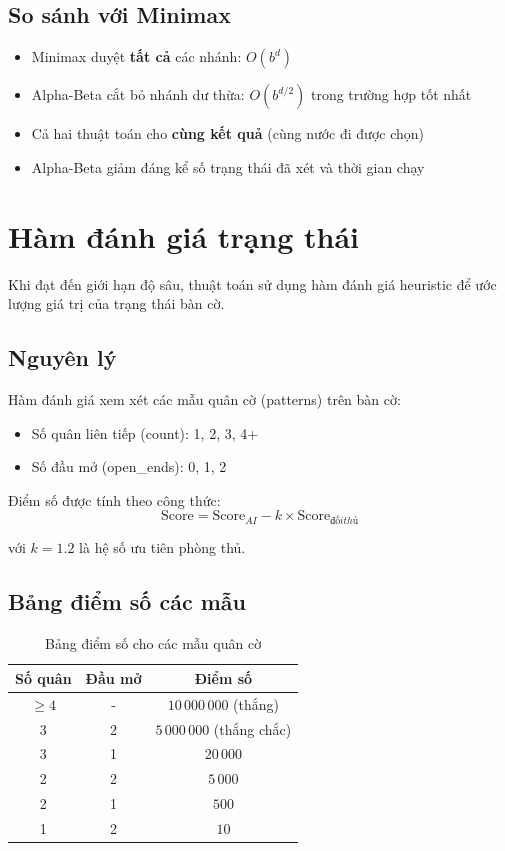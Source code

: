 \documentclass[12pt,a4paper]{article}
\begin{document}
\subsection{So sánh với Minimax}

\begin{itemize}
    \item Minimax duyệt \textbf{tất cả} các nhánh: $O(b^d)$
    \item Alpha-Beta cắt bỏ nhánh dư thừa: $O(b^{d/2})$ trong trường hợp tốt nhất
    \item Cả hai thuật toán cho \textbf{cùng kết quả} (cùng nước đi được chọn)
    \item Alpha-Beta giảm đáng kể số trạng thái đã xét và thời gian chạy
\end{itemize}

\section{Hàm đánh giá trạng thái}

Khi đạt đến giới hạn độ sâu, thuật toán sử dụng hàm đánh giá heuristic để ước lượng giá trị của trạng thái bàn cờ.

\subsection{Nguyên lý}

Hàm đánh giá xem xét các mẫu quân cờ (patterns) trên bàn cờ:
\begin{itemize}
    \item Số quân liên tiếp (count): 1, 2, 3, 4+
    \item Số đầu mở (open\_ends): 0, 1, 2
\end{itemize}

Điểm số được tính theo công thức:
$$\text{Score} = \text{Score}_{AI} - k \times \text{Score}_{đối thủ}$$

với $k = 1.2$ là hệ số ưu tiên phòng thủ.

\subsection{Bảng điểm số các mẫu}

\begin{table}[h]
\centering
\begin{tabular}{|c|c|c|}
\hline
\textbf{Số quân} & \textbf{Đầu mở} & \textbf{Điểm số} \\
\hline
$\geq 4$ & - & $10\,000\,000$ (thắng) \\
3 & 2 & $5\,000\,000$ (thắng chắc) \\
3 & 1 & $20\,000$ \\
2 & 2 & $5\,000$ \\
2 & 1 & $500$ \\
1 & 2 & $10$ \\
\hline
\end{tabular}
\caption{Bảng điểm số cho các mẫu quân cờ}
\end{table}
\end{document}
